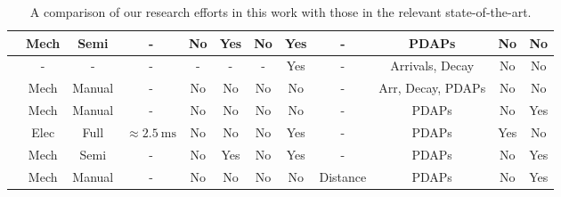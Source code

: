 \documentclass[12pt, draftcls, onecolumn]{IEEEtran}
\begin{document}
\begin{table}
\begin{tabular}{|*{12}{c|}}
    \hline
    \cite{PDAPs} & Mech & Semi & - & No & Yes & No & Yes & - & PDAPs & No & No\\
    \hline
    \cite{Indoor60G} & - & - & - & - & - & - & Yes & - & Arrivals, Decay & No & No\\
    \hline
    \cite{QDC_NIST} & Mech & Manual & - & No & No & No & No & - & Arr, Decay, PDAPs & No & No\\
    \hline
    \cite{D2DHumanBlockage} & Mech & Manual & - & No & No & No & No & - & PDAPs & No & Yes\\
    \hline
    \cite{DopplerHST} & Elec & Full & ${\approx}\SI{2.5}{\milli\second}$ & No & No & No & Yes & - & PDAPs & Yes & No\\
    \hline
    \cite{V2XBlockages} & Mech & Semi & - & No & Yes & No & Yes & - & PDAPs & No & Yes\\
    \hline
    \cite{MacCartneyUrbanHumanBlockage} & Mech & Manual & - & No & No & No & No & Distance & PDAPs & No & Yes\\
    \hline
    \end{tabular}
    \vspace{-1mm}
    \caption{A comparison of our research efforts in this work with those in the relevant state-of-the-art.}
    \label{T2}
\end{table}
\end{document}
